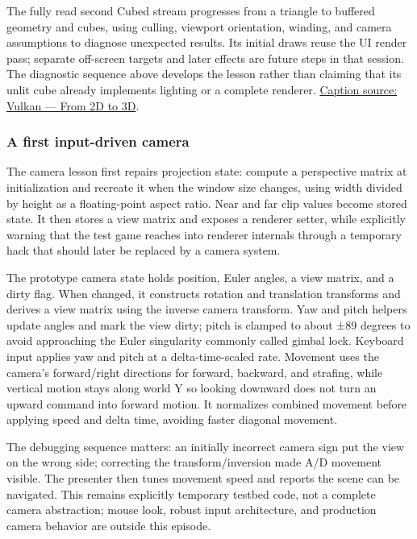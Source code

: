 The fully read second Cubed stream progresses from a triangle to buffered geometry and cubes, using culling, viewport orientation, winding, and camera assumptions to diagnose unexpected results. Its initial draws reuse the UI render pass; separate off-screen targets and later effects are future steps in that session. The diagnostic sequence above develops the lesson rather than claiming that its unlit cube already implements lighting or a complete renderer. \href{https://www.youtube.com/watch?v=hSL9dCjwoCU}{Caption source: Vulkan --- From 2D to 3D}.

\subsubsection{A first input-driven camera}\label{06-engine-ii-ch026-a-first-input-driven-camera}

The camera lesson first repairs projection state: compute a perspective matrix at initialization and recreate it when the window size changes, using width divided by height as a floating-point aspect ratio. Near and far clip values become stored state. It then stores a view matrix and exposes a renderer setter, while explicitly warning that the test game reaches into renderer internals through a temporary hack that should later be replaced by a camera system.

The prototype camera state holds position, Euler angles, a view matrix, and a dirty flag. When changed, it constructs rotation and translation transforms and derives a view matrix using the inverse camera transform. Yaw and pitch helpers update angles and mark the view dirty; pitch is clamped to about ±89 degrees to avoid approaching the Euler singularity commonly called gimbal lock. Keyboard input applies yaw and pitch at a delta-time-scaled rate. Movement uses the camera's forward/right directions for forward, backward, and strafing, while vertical motion stays along world Y so looking downward does not turn an upward command into forward motion. It normalizes combined movement before applying speed and delta time, avoiding faster diagonal movement.

The debugging sequence matters: an initially incorrect camera sign put the view on the wrong side; correcting the transform/inversion made A/D movement visible. The presenter then tunes movement speed and reports the scene can be navigated. This remains explicitly temporary testbed code, not a complete camera abstraction; mouse look, robust input architecture, and production camera behavior are outside this episode.

